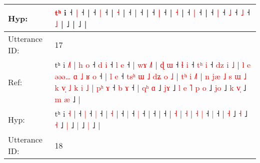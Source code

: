 \documentclass[10pt]{article}
\DeclareRobustCommand{\hl}[1]{{\textcolor{red}{#1}}}
\begin{document}
\begin{longtable}{ll}
 \\
Hyp: & \hl{}\hl{}\hl{}\hl{}\hl{}\hl{t}\hl{ʰ} i ˧\hl{}\hl{} \hl{|} ˧ |\hl{}\hl{}\hl{}\hl{} ˧\hl{}\hl{} \hl{|} ˧ |\hl{}\hl{}\hl{}\hl{}\hl{}\hl{}\hl{}\hl{}\hl{} \hl{}\hl{˧} |\hl{}\hl{}\hl{}\hl{} ˧\hl{}\hl{}\hl{} \hl{|} ˧\hl{}\hl{}\hl{}\hl{}\hl{}\hl{} |\hl{}\hl{}\hl{}\hl{}\hl{}\hl{}\hl{}\hl{}\hl{} ˧\hl{}\hl{} \hl{|} ˧ |\hl{}\hl{}\hl{}\hl{} \hl{}\hl{˧} |\hl{}\hl{}\hl{}\hl{} ˧\hl{}\hl{}\hl{} \hl{|} ˧\hl{} |\hl{}\hl{}\hl{}\hl{} ˧\hl{}\hl{} \hl{|} ˧\hl{}\hl{}\hl{}\hl{} \hl{˩} ˧\hl{}\hl{} \hl{˩} ˧\hl{}\hl{}\hl{}\hl{}\hl{} \hl{}\hl{˩} |\hl{}\hl{}\hl{}\hl{} ˩ |\hl{}\hl{}\hl{}\hl{}\hl{}\hl{}\hl{}\hl{}\hl{}\hl{}\hl{}\hl{}\hl{}\hl{}\hl{}\hl{}\hl{}\hl{}\hl{}\hl{} ˩ |
 \\
\midrule
Utterance ID: & 17 \\
Ref: & tʰ i \hl{˩}\hl{˥} |\hl{ }\hl{h}\hl{ }\hl{o} ˧\hl{ }\hl{d} \hl{i} ˧\hl{ }\hl{l} \hl{e} ˧ |\hl{ }\hl{w}\hl{ɤ} \hl{˩}\hl{˥} |\hl{ }\hl{ɖ}\hl{ }\hl{ɯ} ˧\hl{ }\hl{ɬ} \hl{i} ˧\hl{ }\hl{t}\hl{ʰ} \hl{i} ˧\hl{ }\hl{d}\hl{z}\hl{ }\hl{i}\hl{ }\hl{˩} |\hl{ }\hl{l}\hl{ }\hl{e}\hl{ }\hl{ə}\hl{ə}\hl{ə}\hl{…}\hl{ }\hl{ɑ}\hl{ }\hl{˩}\hl{ }\hl{ʁ}\hl{ }\hl{o} ˧ |\hl{ }\hl{l}\hl{ }\hl{e} ˧\hl{ }\hl{t}\hl{s}\hl{ʰ}\hl{ }\hl{ɯ}\hl{ }\hl{˩}\hl{ }\hl{d}\hl{ʑ}\hl{ }\hl{o}\hl{ }\hl{˩} |\hl{ }\hl{t}\hl{ʰ}\hl{ }\hl{i} \hl{˩}\hl{˥} |\hl{ }\hl{n}\hl{ }\hl{j}\hl{æ}\hl{ }\hl{˩}\hl{ }\hl{s}\hl{ }\hl{ɯ}\hl{ }\hl{˩}\hl{ }\hl{k}\hl{ }\hl{v}\hl{̩}\hl{ }\hl{˩}\hl{ }\hl{k}\hl{ }\hl{i} \hl{˩} | \hl{p}\hl{ʰ} \hl{ɤ} ˧\hl{ }\hl{b} \hl{ɤ} ˧ |\hl{ }\hl{q}\hl{ʰ} \hl{ɑ} ˩ \hl{j}\hl{ɤ} ˩\hl{ }\hl{l}\hl{ }\hl{e}\hl{ }\hl{˥}\hl{ }\hl{p} \hl{o} ˩ \hl{j}\hl{o} ˩\hl{ }\hl{k} \hl{v}\hl{̩} ˩\hl{ }\hl{m} \hl{æ} ˩ |
 \\
Hyp: & tʰ i \hl{}\hl{˧} |\hl{}\hl{}\hl{}\hl{} ˧\hl{}\hl{} \hl{|} ˧\hl{}\hl{} \hl{|} ˧ |\hl{}\hl{}\hl{} \hl{}\hl{˧} |\hl{}\hl{}\hl{}\hl{} ˧\hl{}\hl{} \hl{|} ˧\hl{}\hl{}\hl{} \hl{|} ˧\hl{}\hl{}\hl{}\hl{}\hl{}\hl{}\hl{} |\hl{}\hl{}\hl{}\hl{}\hl{}\hl{}\hl{}\hl{}\hl{}\hl{}\hl{}\hl{}\hl{}\hl{}\hl{}\hl{}\hl{} ˧ |\hl{}\hl{}\hl{}\hl{} ˧\hl{}\hl{}\hl{}\hl{}\hl{}\hl{}\hl{}\hl{}\hl{}\hl{}\hl{}\hl{}\hl{}\hl{}\hl{} |\hl{}\hl{}\hl{}\hl{}\hl{} \hl{}\hl{˧} |\hl{}\hl{}\hl{}\hl{}\hl{}\hl{}\hl{}\hl{}\hl{}\hl{}\hl{}\hl{}\hl{}\hl{}\hl{}\hl{}\hl{}\hl{}\hl{}\hl{}\hl{}\hl{}\hl{}\hl{} \hl{˧} | \hl{}\hl{˧} \hl{|} ˧\hl{}\hl{} \hl{|} ˧ |\hl{}\hl{}\hl{} \hl{˧} ˩ \hl{}\hl{˧} ˩\hl{}\hl{}\hl{}\hl{}\hl{}\hl{}\hl{}\hl{} \hl{˧} ˩ \hl{}\hl{|} ˩\hl{}\hl{} \hl{}\hl{|} ˩\hl{}\hl{} \hl{|} ˩ |
 \\
\midrule
Utterance ID: & 18 \\

\end{longtable}
\end{document}
